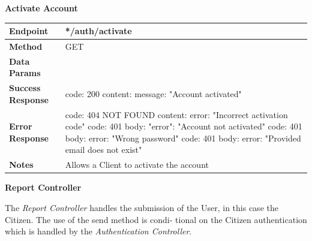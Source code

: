 \documentclass{report}
\begin{document}
\begin{center}{\textbf{Activate Account}}\end{center}
    \begin{tabular}{| l | p{8cm} |}
        \hline
        \textbf{Endpoint} & */auth/activate \\
        \hline
        \textbf{Method} & GET \\
        \hline
        \textbf{Data Params} & \\
        \hline
        \textbf{Success Response} & code: 200 \newline content: {message: "Account activated"}\\
        \hline
        \textbf{Error Response} & code: 404 NOT FOUND \newline content: {error: "Incorrect activation code"} \newline \newline code: 401 \newline body: {"error": "Account not activated"} \newline \newline code: 401 \newline body: {error: "Wrong password"} \newline \newline code: 401 \newline body: {error: "Provided email does not exist"}   \\
        \hline
        \textbf{Notes} & Allows a Client to activate the account \\
        \hline
    \end{tabular}
\begin{center}\large{\textbf{Report Controller}}\end{center}
The \textit{Report Controller} handles the submission of the User, in this case the Citizen. The use of the send method is condi-
tional on the Citizen authentication which is handled by the \textit{Authentication Controller}.
\end{document}
